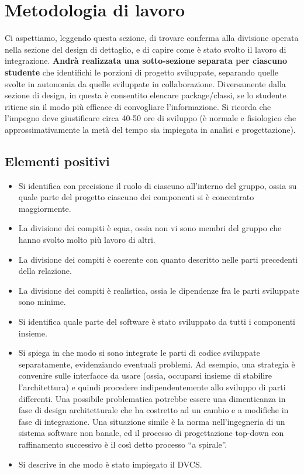 \documentclass[a4paper,12pt]{report}
\begin{document}
\section{Metodologia di lavoro}

Ci aspettiamo, leggendo questa sezione, di trovare conferma alla divisione operata nella sezione del design di dettaglio, e di capire come è stato svolto il lavoro di integrazione.
%
\textbf{Andrà realizzata una sotto-sezione separata per ciascuno studente} che identifichi le porzioni di progetto sviluppate, separando quelle svolte in autonomia da quelle sviluppate in collaborazione.
%
Diversamente dalla sezione di design, in questa è consentito elencare package/classi, se lo studente ritiene sia il modo più efficace di convogliare l'informazione.
%
Si ricorda che l'impegno deve giustificare circa 40-50 ore di sviluppo (è normale e fisiologico che approssimativamente la metà del tempo sia impiegata in analisi e progettazione).

\subsection*{Elementi positivi}

\begin{itemize}
	\item Si identifica con precisione il ruolo di ciascuno all'interno del gruppo, ossia su quale parte del progetto ciascuno dei componenti si è concentrato maggiormente.
	\item La divisione dei compiti è equa, ossia non vi sono membri del gruppo che hanno svolto molto più lavoro di altri.
	\item La divisione dei compiti è coerente con quanto descritto nelle parti precedenti della relazione.
	\item La divisione dei compiti è realistica, ossia le dipendenze fra le parti sviluppate sono minime.
	\item Si identifica quale parte del software è stato sviluppato da tutti i componenti insieme.
	\item Si spiega in che modo si sono integrate le parti di codice sviluppate separatamente, evidenziando eventuali problemi. Ad esempio, una strategia è convenire sulle interfacce da usare (ossia, occuparsi insieme di stabilire l'architettura) e quindi procedere indipendentemente allo sviluppo di parti differenti. Una possibile problematica potrebbe essere una dimenticanza in fase di design architetturale che ha costretto ad un cambio e a modifiche in fase di integrazione. Una situazione simile è la norma nell'ingegneria di un sistema software non banale, ed il processo di progettazione top-down con raffinamento successivo è il così detto processo ``a spirale''.
	\item Si descrive in che modo è stato impiegato il DVCS.
\end{itemize}
\end{document}
